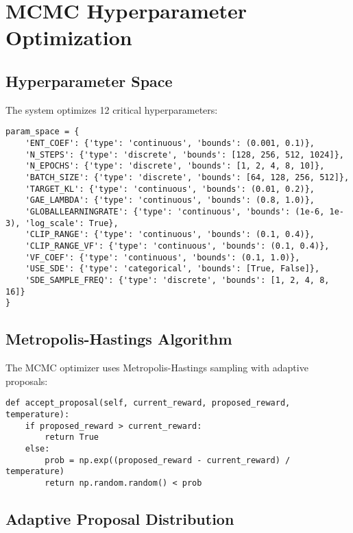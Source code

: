 \documentclass[11pt,a4paper]{article}
\begin{document}
\section{MCMC Hyperparameter Optimization}

\subsection{Hyperparameter Space}

The system optimizes 12 critical hyperparameters:

\begin{lstlisting}[caption={Hyperparameter Space (hyperparameter\_optimizer.py:53-127)}]
param_space = {
    'ENT_COEF': {'type': 'continuous', 'bounds': (0.001, 0.1)},
    'N_STEPS': {'type': 'discrete', 'bounds': [128, 256, 512, 1024]},
    'N_EPOCHS': {'type': 'discrete', 'bounds': [1, 2, 4, 8, 10]},
    'BATCH_SIZE': {'type': 'discrete', 'bounds': [64, 128, 256, 512]},
    'TARGET_KL': {'type': 'continuous', 'bounds': (0.01, 0.2)},
    'GAE_LAMBDA': {'type': 'continuous', 'bounds': (0.8, 1.0)},
    'GLOBALLEARNINGRATE': {'type': 'continuous', 'bounds': (1e-6, 1e-3), 'log_scale': True},
    'CLIP_RANGE': {'type': 'continuous', 'bounds': (0.1, 0.4)},
    'CLIP_RANGE_VF': {'type': 'continuous', 'bounds': (0.1, 0.4)},
    'VF_COEF': {'type': 'continuous', 'bounds': (0.1, 1.0)},
    'USE_SDE': {'type': 'categorical', 'bounds': [True, False]},
    'SDE_SAMPLE_FREQ': {'type': 'discrete', 'bounds': [1, 2, 4, 8, 16]}
}
\end{lstlisting}

\subsection{Metropolis-Hastings Algorithm}

The MCMC optimizer uses Metropolis-Hastings sampling with adaptive proposals:

\begin{lstlisting}[caption={MCMC Acceptance Criterion (hyperparameter\_optimizer.py:350-357)}]
def accept_proposal(self, current_reward, proposed_reward, temperature):
    if proposed_reward > current_reward:
        return True
    else:
        prob = np.exp((proposed_reward - current_reward) / temperature)
        return np.random.random() < prob
\end{lstlisting}

\subsection{Adaptive Proposal Distribution}
\end{document}
